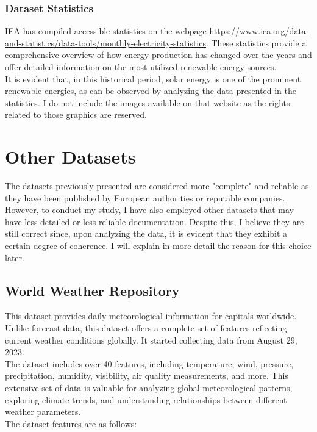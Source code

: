\documentclass[12pt]{article}
\begin{document}
\subsubsection{Dataset Statistics}
IEA has compiled accessible statistics on the webpage \url{https://www.iea.org/data-and-statistics/data-tools/monthly-electricity-statistics}. These statistics provide a comprehensive overview of how energy production has changed over the years and offer detailed information on the most utilized renewable energy sources.
\\
It is evident that, in this historical period, solar energy is one of the prominent renewable energies, as can be observed by analyzing the data presented in the statistics. I do not include the images available on that website as the rights related to those graphics are reserved.

\section{Other Datasets}
The datasets previously presented are considered more "complete" and reliable as they have been published by European authorities or reputable companies. However, to conduct my study, I have also employed other datasets that may have less detailed or less reliable documentation. Despite this, I believe they are still correct since, upon analyzing the data, it is evident that they exhibit a certain degree of coherence. I will explain in more detail the reason for this choice later.

\subsection{World Weather Repository}
This dataset \cite{global-weather-repository} provides daily meteorological information for capitals worldwide. Unlike forecast data, this dataset offers a complete set of features reflecting current weather conditions globally. It started collecting data from August 29, 2023.
\\
The dataset includes over 40 features, including temperature, wind, pressure, precipitation, humidity, visibility, air quality measurements, and more. This extensive set of data is valuable for analyzing global meteorological patterns, exploring climate trends, and understanding relationships between different weather parameters.
\\
The dataset features are as follows:
\end{document}
